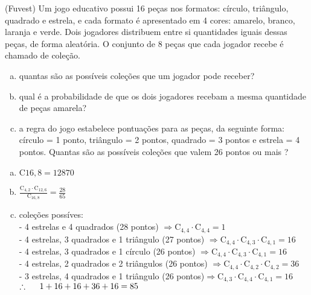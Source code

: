 \begin{ex}
  (Fuvest) Um jogo educativo possui 16 peças nos formatos: círculo, triângulo, quadrado e estrela, e cada formato é apresentado em 4 cores: amarelo, branco, laranja e verde. Dois jogadores distribuem entre si quantidades iguais dessas peças, de forma aleatória. O conjunto de 8 peças que cada jogador recebe é chamado de coleção.
      \begin{enumerate} [(a)]
          \item quantas são as possíveis coleções que um jogador pode receber?
          \item qual  é a probabilidade de que os dois jogadores recebam a mesma quantidade de peças amarela?
          \item a regra do jogo estabelece pontuações para as peças, da seguinte forma: círculo = 1 ponto, triângulo = 2 pontos, quadrado = 3 pontos e estrela = 4 pontos. Quantas são as possíveis coleções que valem 26 pontos ou mais ?
      \end{enumerate}
        \begin{sol}
         \phantom{A}
          \begin{enumerate} [(a)]
              \item $\mathrm{C}{{16},8}=12870
              $
              \item $\frac{\mathrm{C}_{4,2}\cdot\mathrm{C}_{{12},6}}{\mathrm{C}_{{16},8}}=\frac{28}{65}$
              \item coleções possíves:\\
              - 4 estrelas e 4 quadrados (28 pontos) $\Longrightarrow \mathrm{C}_{4,4}\cdot\mathrm{C}_{4,4}=1$ \\
              - 4 estrelas, 3 quadrados e 1 triângulo (27 pontos) $\Longrightarrow \mathrm{C}_{4,4}\cdot\mathrm{C}_{4,3}\cdot\mathrm{C}_{4,1}=16$\\
              - 4 estrelas, 3 quadrados e 1 círculo (26 pontos) $\Longrightarrow \mathrm{C}_{4,4}\cdot\mathrm{C}_{4,3}\cdot\mathrm{C}_{4,1}=16$ \\
              - 4 estrelas, 2 quadrados e 2 triângulos  (26 pontos) $\Longrightarrow \mathrm{C}_{4,4}\cdot\mathrm{C}_{4,2}\cdot\mathrm{C}_{4,2}=36$\\
              - 3 estrelas, 4 quadrados e 1 triângulo
              (26 pontos)$\Longrightarrow \mathrm{C}_{4,3}\cdot\mathrm{C}_{4,4}\cdot\mathrm{C}_{4,1}=16$\\
              $\therefore \hspace{0,5cm} 1+16+16+36+16=85$
          \end{enumerate}
        \end{sol}
  \end{ex}